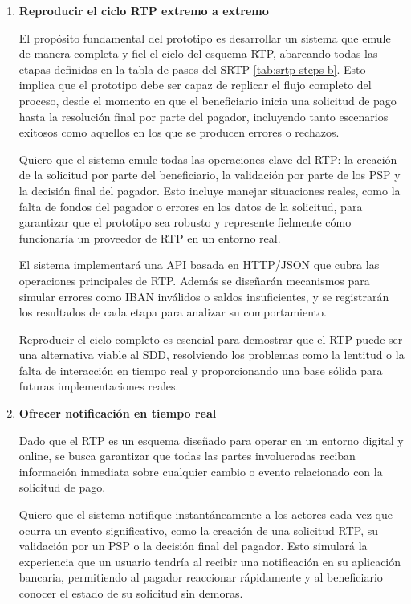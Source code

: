 \begin{enumerate}[label=\textbf{\arabic*}]
  \item \textbf{Reproducir el ciclo RTP extremo a extremo}
    
    El propósito fundamental del prototipo es desarrollar un sistema que emule de manera completa y fiel el ciclo del esquema RTP, abarcando todas las etapas definidas en la tabla de pasos del SRTP \ref{tab:srtp-steps-b}. Esto implica que el prototipo debe ser capaz de replicar el flujo completo del proceso, desde el momento en que el beneficiario inicia una solicitud de pago hasta la resolución final por parte del pagador, incluyendo tanto escenarios exitosos como aquellos en los que se producen errores o rechazos.
    
    Quiero que el sistema emule todas las operaciones clave del RTP: la creación de la solicitud por parte del beneficiario, la validación por parte de los PSP y la decisión final del pagador. Esto incluye manejar situaciones reales, como la falta de fondos del pagador o errores en los datos de la solicitud, para garantizar que el prototipo sea robusto y represente fielmente cómo funcionaría un proveedor de RTP en un entorno real.
    
    El sistema implementará una API basada en HTTP/JSON que cubra las operaciones principales de RTP. Además se diseñarán mecanismos para simular errores como IBAN inválidos o saldos insuficientes, y se registrarán los resultados de cada etapa para analizar su comportamiento.
    
    Reproducir el ciclo completo es esencial para demostrar que el RTP puede ser una alternativa viable al SDD, resolviendo los problemas como la lentitud o la falta de interacción en tiempo real y proporcionando una base sólida para futuras implementaciones reales.

  \item \textbf{Ofrecer notificación en tiempo real}
    
    Dado que el RTP es un esquema diseñado para operar en un entorno digital y online, se busca garantizar que todas las partes involucradas reciban información inmediata sobre cualquier cambio o evento relacionado con la solicitud de pago.

    Quiero que el sistema notifique instantáneamente a los actores cada vez que ocurra un evento significativo, como la creación de una solicitud RTP, su validación por un PSP o la decisión final del pagador. Esto simulará la experiencia que un usuario tendría al recibir una notificación en su aplicación bancaria, permitiendo al pagador reaccionar rápidamente y al beneficiario conocer el estado de su solicitud sin demoras.


\end{enumerate}
